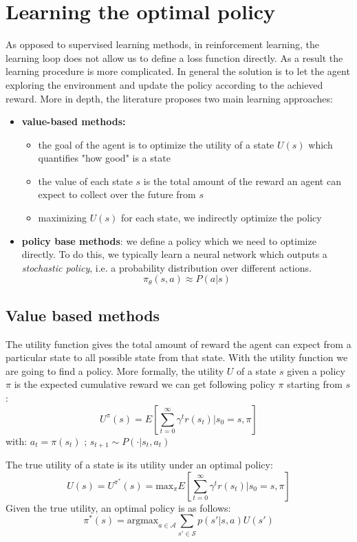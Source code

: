 \section{Learning the optimal policy}
As opposed to supervised learning methods, in reinforcement learning, the learning loop does not allow us to define a loss function directly. As a result the learning procedure is more complicated. In general the solution is to let the agent exploring the environment and update the policy according to the achieved reward. More in depth, the literature proposes two main learning approaches:
\begin{itemize}
    \item \textbf{value-based methods:}
    \begin{itemize}
        \item the goal of the agent is to optimize the utility of a state $U(s)$ which quantifies "how good" is a state
        \item the value of each state $s$ is the total amount of the reward an agent can expect to collect over the future from $s$
        \item maximizing $U(s)$ for each state, we indirectly optimize the policy
    \end{itemize}
    \item \textbf{policy base methods}: we define a policy which we need to optimize directly. To do this, we typically learn a neural network which outputs a \textit{stochastic policy}, i.e. a probability distribution over different actions.
    $$\pi_\theta (s,a) \approx P(a|s)$$
\end{itemize}

\subsection{Value based methods}
The utility function gives the total amount of reward the agent can expect from a particular state to all possible state from that state. With the utility function we are going to find a policy. More formally, the utility $U$ of a state $s$ given a policy $\pi$ is the expected cumulative reward we can get following policy $\pi$ starting from $s$:
\begin{equation}
    U^{\pi}(s) = E[\sum_{t=0}^{\infty} \gamma^t r(s_t) | s_0 = s, \pi] 
\end{equation}
with: $a_t = \pi(s_t)$ ; $s_{t+1} \sim P(\cdot | s_t, a_t)$ \newline

The true utility of a state is its utility under an optimal policy:
\begin{equation}
    U(s) = U^{\pi^{*}}(s) = \text{max}_{\pi} E[\sum_{t=0}^{\infty} \gamma^t r(s_t) | s_0 = s, \pi]
\end{equation}
Given the true utility, an optimal policy is as follows:
\begin{equation}
    \pi^*(s) = \text{argmax}_{a \in \mathcal{A}} \sum_{s' \in \mathcal{S}} p(s' | s, a) U(s')
\end{equation}

